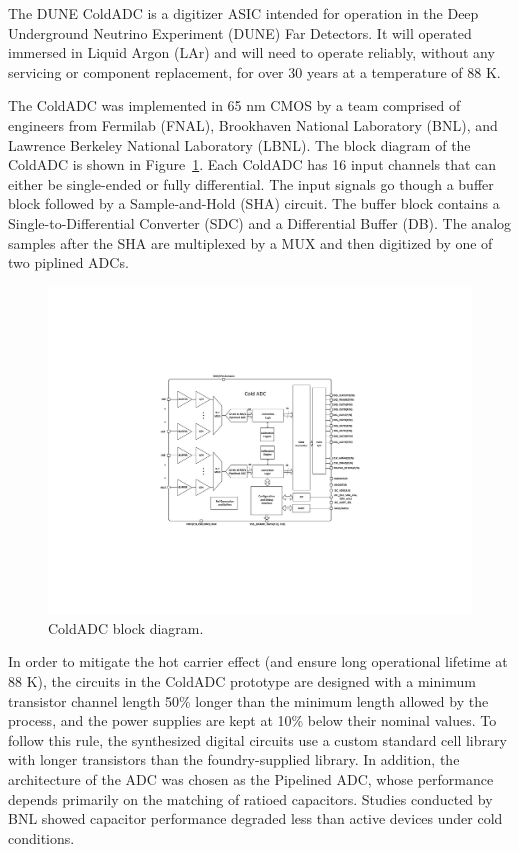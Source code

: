\label{sec:1}

The DUNE ColdADC is a digitizer ASIC intended for operation in the Deep Underground Neutrino Experiment (DUNE) Far Detectors. It will operated immersed in Liquid Argon (LAr) and will need to operate reliably, without any servicing or component replacement, for over 30 years at a temperature of 88 K.

The ColdADC was implemented in 65 nm CMOS by a team comprised of engineers from Fermilab (FNAL), Brookhaven National Laboratory (BNL), and Lawrence Berkeley National Laboratory (LBNL). The block diagram of the ColdADC is shown in Figure~\ref{fig:coldadc_blockdiagram}.
Each ColdADC has 16 input channels that can either be single-ended or fully differential. The input signals go though a buffer block followed by a Sample-and-Hold (SHA) circuit. The buffer block contains a Single-to-Differential Converter (SDC) and a Differential Buffer (DB). The analog samples after the SHA are multiplexed by a MUX and then digitized by one of two piplined ADCs.
\begin{figure}[h!]
\centering
  \includegraphics[width=0.8\linewidth]{figures/coldadc_blockdiagram.pdf}
  \caption{ColdADC block diagram.}
  \label{fig:coldadc_blockdiagram}
\end{figure}

In order to mitigate the hot carrier effect (and ensure long operational lifetime at 88 K), the circuits in the ColdADC prototype
are designed with a minimum transistor channel 
length 50\% longer than the minimum length allowed by the process, and the power supplies are kept at 10\% below their nominal 
values. To follow this rule, the synthesized digital circuits use a custom standard cell library with longer 
transistors than the foundry-supplied library. In addition, the architecture of the ADC was chosen as the Pipelined ADC, whose 
performance depends primarily on the matching of ratioed capacitors. Studies conducted by BNL showed capacitor performance 
degraded less than active devices under cold conditions. 

